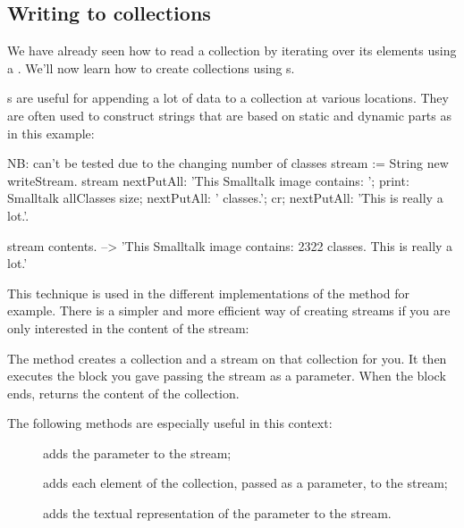 \documentclass[a4paper,10pt,twoside]{book}
\begin{document}
\subsection{Writing to collections}

We have already seen how to read a collection by iterating over its elements using a .
We'll now learn how to create collections using s.

s are useful for appending a lot of data to a collection at various locations.
They are often used to construct strings that are based on static and dynamic parts as in this example:

\begin{code}{NB: can't be tested due to the changing number of classes}
stream := String new writeStream.
stream
	nextPutAll: 'This Smalltalk image contains: ';
	print: Smalltalk allClasses size;
	nextPutAll: ' classes.';
	cr;
	nextPutAll: 'This is really a lot.'.

stream contents. --> 'This Smalltalk image contains: 2322 classes.
This is really a lot.'
\end{code}

This technique is used in the different implementations of the method  for example.
There is a simpler and more efficient way of creating streams if you are only interested in the content of the stream:


The method  \label{sec:streamContents} creates a collection and a stream on
that collection for you.
It then executes the block you gave passing the stream as a parameter.
When the block ends,  returns the content of the collection.

The following  methods are especially useful in this context:

\begin{description}
\item[] adds the parameter to the stream;
\item[] adds each element of the collection, passed as a
  parameter, to the stream;
\item[] adds the textual representation of the parameter to the
  stream.
\end{description}
\end{document}
